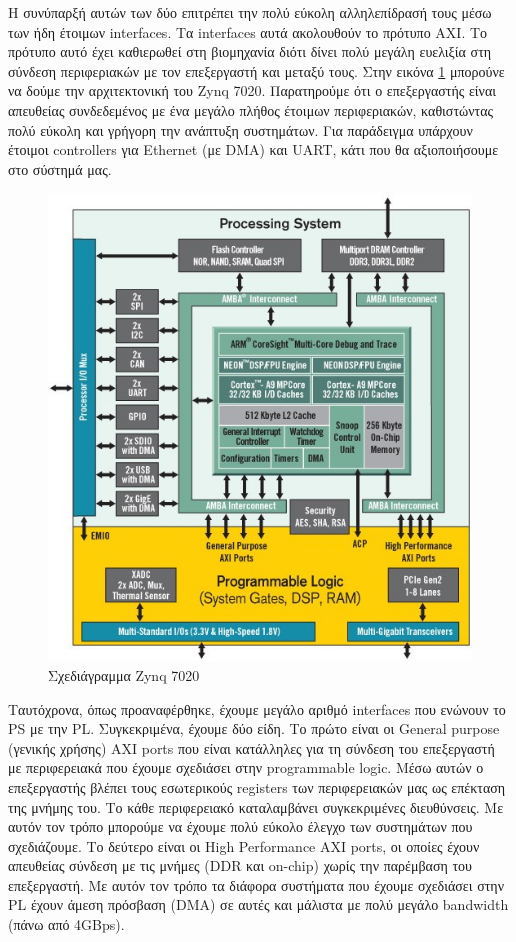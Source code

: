 \documentclass[12pt,a4paper]{book}
\begin{document}
Η συνύπαρξή αυτών των δύο επιτρέπει την πολύ εύκολη αλληλεπίδρασή τους μέσω των ήδη έτοιμων interfaces. Τα interfaces αυτά ακολουθούν το πρότυπο AXI. Το πρότυπο αυτό έχει καθιερωθεί στη βιομηχανία διότι δίνει πολύ μεγάλη ευελιξία στη σύνδεση περιφεριακών με τον επεξεργαστή και μεταξύ τους. Στην εικόνα \ref{zynq7020} μπορούνε να δούμε την αρχιτεκτονική του Zynq 7020. Παρατηρούμε ότι ο επεξεργαστής είναι απευθείας συνδεδεμένος με ένα μεγάλο πλήθος έτοιμων περιφεριακών, καθιστώντας πολύ εύκολη και γρήγορη την ανάπτυξη συστημάτων. Για παράδειγμα υπάρχουν έτοιμοι controllers για Ethernet (με DMA) και UART, κάτι που θα αξιοποιήσουμε στο σύστημά μας.
\begin{figure}
	\centering
	\includegraphics[width=\textwidth]{zynq7020}
	\caption{Σχεδιάγραμμα Zynq 7020}
	\label{zynq7020}
\end{figure}
Ταυτόχρονα, όπως προαναφέρθηκε, έχουμε μεγάλο αριθμό interfaces που ενώνουν το PS με την PL. Συγκεκριμένα, έχουμε δύο είδη. Το πρώτο είναι οι General purpose (γενικής χρήσης) AXI ports που είναι κατάλληλες για τη σύνδεση του επεξεργαστή με περιφερειακά που έχουμε σχεδιάσει στην programmable logic. Μέσω αυτών ο επεξεργαστής βλέπει τους εσωτερικούς registers των περιφερειακών μας ως επέκταση της μνήμης του. Το κάθε περιφερειακό καταλαμβάνει συγκεκριμένες διευθύνσεις. Με αυτόν τον τρόπο μπορούμε να έχουμε πολύ εύκολο έλεγχο των συστημάτων που σχεδιάζουμε. 
Το δεύτερο είναι οι High Performance AXI ports, οι οποίες έχουν απευθείας σύνδεση με τις μνήμες (DDR και on-chip) χωρίς την παρέμβαση του επεξεργαστή. Με αυτόν τον τρόπο τα διάφορα συστήματα που έχουμε σχεδιάσει στην PL έχουν άμεση πρόσβαση (DMA) σε αυτές και μάλιστα με πολύ μεγάλο bandwidth (πάνω από 4GBps).  
\end{document}
